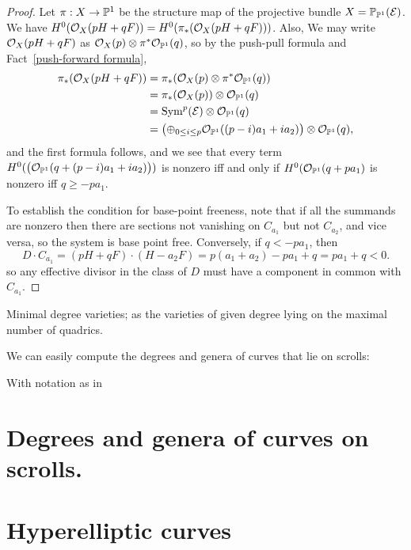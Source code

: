 \begin{proof} Let $\pi:X\to {\mathbb P}^{1}$ be the structure map of the projective bundle $X = {\mathbb P}_{{\mathbb P}^{1}}({\mathcal E})$.
We have $H^{0}({\mathcal O}_{X}(pH+qF)) = H^{0}(\pi_{*}({\mathcal O}_{X}(pH+qF)))$. Also, 
We may write ${\mathcal O}_{X}(pH+qF)$ as ${\mathcal O}_{X}(p) \otimes \pi^{*}{\mathcal O}_{{\mathbb P}^{1}}(q)$, so by the push-pull formula
and Fact~\ref{push-forward formula},
\begin{align*}
\pi_{*}({\mathcal O}_{X}(pH+qF)) &= \pi_{*}({\mathcal O}_{X}(p) \otimes \pi^{*}{\mathcal O}_{{\mathbb P}^{1}}(q)) \\
 &= \pi_{*}({\mathcal O}_{X}(p))\otimes {\mathcal O}_{{\mathbb P}^{1}}(q)\\
&=  \operatorname{Sym}^{p}({\mathcal E})\otimes {\mathcal O}_{{\mathbb P}^{1}}(q)\\
&=  \bigl(\oplus_{0\leq i\leq p} {\mathcal O}_{{\mathbb P}^{1}}((p-i)a_{1}+i a_{2})\bigr) \otimes {\mathcal O}_{{\mathbb P}^{1}}(q),
\end{align*}
and the first formula follows, and we see that every term 
$H^{0}(\bigl({\mathcal O}_{{\mathbb P}^{1}}(q + (p-i)a_{1}+i a_{2})\bigr))$ is nonzero iff and only if 
$H^{0}({\mathcal O}_{{\mathbb P}^{1}}(q + pa_{1})$ is nonzero iff $q\geq -pa_{1}$.

To establish the condition for base-point freeness, note that if all the summands are nonzero then
there are sections not vanishing on $C_{a_{1}}$ but not $C_{a_{2}}$, and vice versa, so the system is base point free. Conversely, if $q<-pa_{1}$, then 
$$
D\cdot C_{a_{1}} = (pH+qF) \cdot (H-a_{2}F) = p(a_{1}+a_{2}) -pa_{1}+q = pa_{1}+q < 0.
$$
so any effective divisor in the class of $D$ must have a component in common with $C_{a_{1}}$.
\end{proof}


\begin{exercise} 
 Minimal degree varieties; as the varieties of given degree lying on the maximal number of quadrics.
\end{exercise}
 
We can easily compute the degrees and genera of curves that lie on scrolls:

\begin{proposition}
 With notation as in 
\end{proposition}
  
\section{Degrees and genera of curves on scrolls.} 

\section{Hyperelliptic curves}

